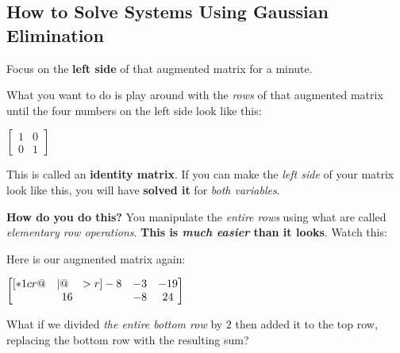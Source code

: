 \documentclass[12pt,tiks]{article}
\begin{document}
    \subsection*{How to Solve Systems Using Gaussian Elimination}
    Focus on the \textbf{left side} of that augmented matrix for a minute.
    \par\vspace{.05in}
    \begin{minipage}[t][.5in][t]{2.4in}\RaggedRight
    What you want to do is play around with the \textit{rows} of that augmented matrix until the four numbers on the left side look like this:
    \end{minipage}
    \hspace{.1in}
    \begin{minipage}[t][.5in][t]{1in}\RaggedRight
    \par\vspace{.05in}\hspace{.15in}
        $
        \begin{bmatrix}
          1 & 0 \\
          0 & 1
        \end{bmatrix}
        $
    \end{minipage}
    \hspace{.1in}
    \begin{minipage}[t][.5in][t]{2.4in}\RaggedRight
    This is called an \textbf{identity matrix}. If you can make the \textit{left side} of your matrix look like this, you will have \textbf{solved it} for \textit{both variables}.
    \end{minipage}
    
    \-\hspace*{\fill}
    \-\vspace*{.15in}
    
    \textbf{How do you do this?} You manipulate the \textit{entire rows} using what are called \textit{elementary row operations}. \textbf{This is \textit{much easier} than it looks}. Watch this:
    
    \par\vspace{.05in}
    
    \begin{minipage}[t][.5in][t]{2.5in}\RaggedRight
    Here is our augmented matrix again:
    
    \par\vspace{.05in}
    
        $
            \begin{bmatrix}[*1cr@{\quad}|@{\quad}>{\color{black}}r]
              -8 & -3 & -19 \\
              16 & -8 & 24
            \end{bmatrix}
        $
    \end{minipage}
    \hspace{.1in}
    \begin{minipage}[t][.5in][t]{2.4in}\RaggedRight
    What if we divided \textit{the entire bottom row} by $2$ then added it to the top row, replacing the bottom row with the resulting sum?
    \end{minipage}
    
\end{document}
